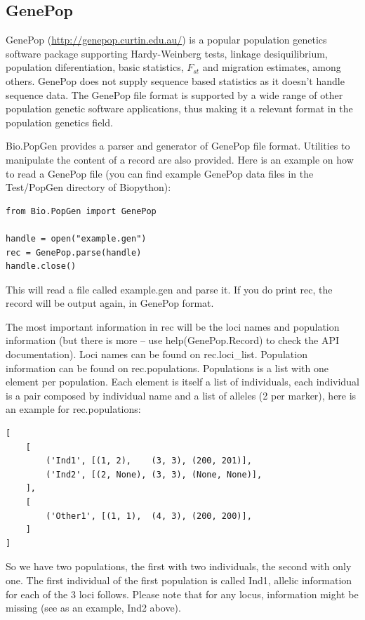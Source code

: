 \documentclass{report}
\begin{document}
\subsection{GenePop}

GenePop (\url{http://genepop.curtin.edu.au/}) is a popular population
genetics software package supporting Hardy-Weinberg tests, linkage
desiquilibrium, population diferentiation, basic statistics, $F_{st}$ and
migration estimates, among others. GenePop does not supply sequence
based statistics as it doesn't handle sequence data.
The GenePop file format is supported by a wide range of other population
genetic software applications, thus making it a relevant format in the
population genetics field.

Bio.PopGen provides a parser and generator of GenePop file format.
Utilities to manipulate the content of a record are also provided.
Here is an example on how to read a GenePop file (you can find
example GenePop data files in the Test/PopGen directory of Biopython):

\begin{verbatim}
from Bio.PopGen import GenePop

handle = open("example.gen")
rec = GenePop.parse(handle)
handle.close()
\end{verbatim}

This will read a file called example.gen and parse it. If you
do print rec, the record will be output again, in GenePop format.

The most important information in rec will be the loci names and
population information (but there is more -- use help(GenePop.Record)
to check the API documentation). Loci names can be found on rec.loci\_list.
Population information can be found on rec.populations.
Populations is a list with one element per population. Each element is itself
a list of individuals, each individual is a pair composed by individual
name and a list of alleles (2 per marker), here is an example for
rec.populations:

\begin{verbatim}
[
    [
        ('Ind1', [(1, 2),    (3, 3), (200, 201)],
        ('Ind2', [(2, None), (3, 3), (None, None)],
    ],
    [
        ('Other1', [(1, 1),  (4, 3), (200, 200)],
    ]
]
\end{verbatim}

So we have two populations, the first with two individuals, the
second with only one. The first individual of the first
population is called Ind1, allelic information for each of
the 3 loci follows. Please note that for any locus, information
might be missing (see as an example, Ind2 above).
\end{document}
